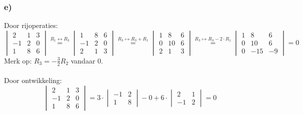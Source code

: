 \documentclass[lineaire_algebra_oplossingen.tex]{subfiles}
\begin{document}
\subsubsection*{e)}
Door rijoperaties:
$$
\begin{vmatrix}
2 & 1 & 3\\
-1 & 2 & 0\\
1 & 8 & 6
\end{vmatrix}
\overset{R_1 \leftrightarrow R_3}{=}
\begin{vmatrix}
1 & 8 & 6\\
-1 & 2 & 0\\
2 & 1 & 3
\end{vmatrix}
\overset{R_3 \longmapsto R_3 + R_1}{=}
\begin{vmatrix}
1 & 8 & 6\\
0 & 10 & 6\\
2 & 1 & 3
\end{vmatrix}
\overset{R_3 \longmapsto R_3 - 2\cdot R_1}{=}
\begin{vmatrix}
1 & 8 & 6\\
0 & 10 & 6\\
0 & -15 & -9
\end{vmatrix}
= 0
$$
Merk op: $R_3 = -\frac{3}{2} R_2$ vandaar $0$.\\
\\
Door ontwikkeling:
$$
\begin{vmatrix}
2 & 1 & 3\\
-1 & 2 & 0\\
1 & 8 & 6
\end{vmatrix}
=
3 \cdot
\begin{vmatrix}
-1 & 2\\
1 & 8
\end{vmatrix}
-0
+6 \cdot
\begin{vmatrix}
2 & 1\\
-1 & 2
\end{vmatrix}
= 0
$$
\end{document}
